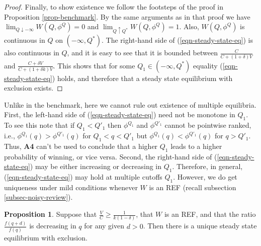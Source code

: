 \documentclass[12pt]{article}
\theoremstyle{plain}
\theoremstyle{definition}
\newtheorem{proposition}{Proposition}
\theoremstyle{remark}
\begin{document}
\begin{proof}
    Finally, to show existence we follow the footsteps of the proof in Proposition \ref{prop-benchmark}. By the same arguments as in that proof we have $\lim_{Q\downarrow -\infty} W(Q,\phi^Q) = 0$ and $\lim_{Q\uparrow Q^*} W(Q,\phi^Q) = 1$. Also, $W(Q,\phi^Q)$ is continuous in $Q$ on $(-\infty,Q^*)$. The right-hand side of (\ref{eqn-steady-state-eq}) is also continuous in $Q$, and it is easy to see that it is bounded between $\frac{C}{C+(1+\delta)V}$ and $\frac{C+\delta V}{C+(1+\delta k)V}$. This shows that for some $Q_1\in(-\infty,Q^*)$ equality (\ref{eqn-steady-state-eq}) holds, and therefore that a steady state equilibrium with exclusion exists.
\end{proof}

\medskip

Unlike in the benchmark, here we cannot rule out existence of multiple equilibria. First, the left-hand side of (\ref{eqn-steady-state-eq}) need not be monotone in $Q_1$. To see this note that if $Q_1<Q'_1$ then $\phi^{Q_1}$ and $\phi^{Q'_1}$ cannot be pointwise ranked, i.e., $\phi^{Q_1}(q)>\phi^{Q'_1}(q)$ for $Q_1<q<Q'_1$ but $\phi^{Q_1}(q)<\phi^{Q'_1}(q)$ for $q>Q'_1$. Thus, \textbf{A4} can't be used to conclude that a higher $Q_1$ leads to a higher probability of winning, or vice versa. Second, the right-hand side of (\ref{eqn-steady-state-eq}) may be either increasing or decreasing in $Q_1$. Therefore, in general, (\ref{eqn-steady-state-eq}) may hold at multiple cutoffs $Q_1$. However, we do get uniqueness under mild conditions whenever $W$ is an REF (recall subsection \ref{subsec-noisy-review}).


\begin{proposition}\label{prop-unique-ban}
   Suppose that $\frac{V}{C}\ge \frac{1}{k(1-\delta)}$, that $W$ is an REF, and that the ratio $\frac{f(q+d)}{f(q)}$ is decreasing in $q$ for any given $d>0$. Then there is a unique steady state equilibrium with exclusion.
\end{proposition}
\end{document}
